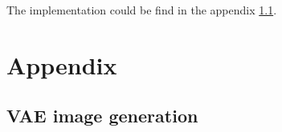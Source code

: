 \documentclass{article}
\begin{document}
The implementation could be find in the appendix \ref{appendix:1B.loss}.

\newpage
\appendix

\section{Appendix}
\subsection{VAE image generation}\label{appendix:1B.loss}

\end{document}
